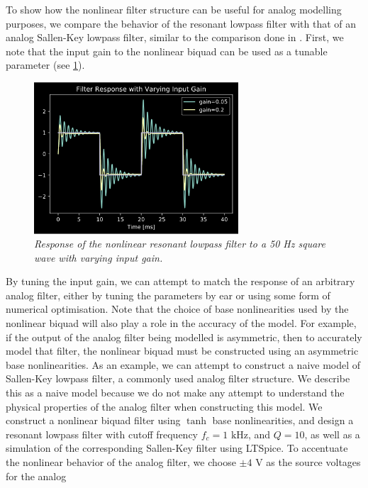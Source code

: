 \documentclass[twoside,a4paper]{article}
\begin{document}
To show how the nonlinear filter structure can be useful
for analog modelling purposes, we compare the behavior of
the resonant lowpass filter with that of an analog Sallen-Key
lowpass filter, similar to the comparison done in \cite{SKF}.
\newline\newline
First, we note that the input gain to the nonlinear biquad can be
used as a tunable parameter (see \cref{50hz}).
%
\begin{figure}[ht]
    \center
    \includegraphics[width=3in]{../Pics/50-Hz_Response.png}
    \caption{\label{50hz}{\it Response of the nonlinear resonant lowpass
                            filter to a 50 Hz square wave with varying input gain.}}
\end{figure}
%
By tuning the input gain, we can attempt to match the response of an
arbitrary analog filter, either by tuning the parameters by ear
or using some form of numerical optimisation. Note that the choice
of base nonlinearities used by the nonlinear biquad will also play a
role in the accuracy of the model. For example, if the output of the
analog filter being modelled is asymmetric, then to accurately model
that filter, the nonlinear biquad must be constructed using an
asymmetric base nonlinearities.
\newline\newline
As an example, we can attempt to construct a naive model of Sallen-Key
lowpass filter, a commonly used analog filter structure. We describe this
as a naive model because we do not make any attempt to understand the physical
properties of the analog filter when constructing this model. We construct
a nonlinear biquad filter using $\tanh$ base nonlinearities, and design a
resonant lowpass filter with cutoff frequency $f_c = 1 \text{ kHz}$,
and $Q=10$, as well as a simulation of the corresponding Sallen-Key
filter using LTSpice. To accentuate the nonlinear behavior of the analog
filter, we choose $\pm 4 \text{ V}$ as the source voltages for the analog
\end{document}
